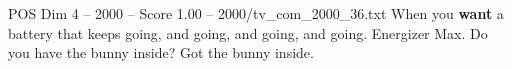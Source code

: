 \begin{textsample}{POS Dim 4 – 2000 – Score 1.00 – 2000/tv\_com\_2000\_36.txt}  \label{ex:f4_pos_077}
When you \textbf{want} a battery that keeps going, and going, and going, and going.
Energizer Max.
Do you have the bunny inside?
Got the bunny inside.

\end{textsample}

